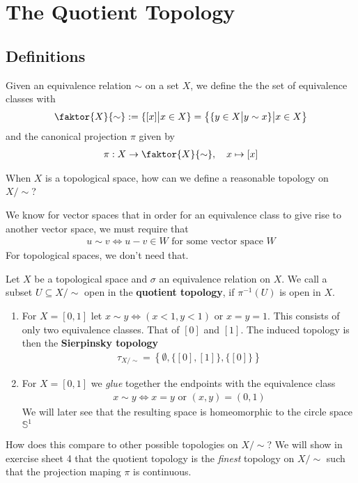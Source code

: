 \section{The Quotient Topology}
\subsection{Definitions}
Given an equivalence relation $\sim$ on a set $X$, we define the the set of equivalence classes with
\begin{align*}
  \faktor{X}{\sim} := \{[x] \big\vert x \in X\} = \left\{\{y \in X \big\vert y \sim x\}\big\vert x \in X\right\}
\end{align*}
and the canonical projection $\pi$ given by
\begin{align*}
  \pi: X \to \faktor{X}{\sim}, \quad x \mapsto [x]
\end{align*}

When $X$ is a topological space, how can we define a reasonable topology on $X/\sim$?

We know for vector spaces that in order for an equivalence class to give rise to another vector space, we must require that
\begin{align*}
  u \sim v \iff u - v \in W \text{ for some vector space } W
\end{align*}
For topological spaces, we don't need that.

\begin{dfn}[]
Let $X$ be a topological space and $\sigma$ an equivalence relation on $X$. 
We call a subset $U \subseteq X/\sim$ open in the \textbf{quotient topology}, if $\pi^{-1}(U)$ is open in $X$.
\end{dfn}


\begin{ex}[]
\begin{enumerate}
  \item For $X = [0,1]$ let $x \sim y \iff (x<1,y<1)$ or $x=y=1$.
      This consists of only two equivalence classes. 
      That of $[0]$ and $[1]$. The induced topology is then the \textbf{Sierpinsky topology}
      \begin{align*}
        \tau_{X/\sim} = \left\{
          \emptyset, \{[0],[1]\}, \{[0]\}
      \right\}
      \end{align*}
    \item For $X = [0,1]$ we \emph{glue} together the endpoints with the equivalence class
      \begin{align*}
        x \sim y \iff x = y \text{ or } (x,y) = (0,1)
      \end{align*}
      We will later see that the resulting space is homeomorphic to the circle space $\mathbb{S}^{1}$
\end{enumerate}
\end{ex}
How does this compare to other possible topologies on $X/\sim$?
We will show in exercise sheet 4 that the quotient topology is the \emph{finest} topology on $X/\sim$ such that the projection maping $\pi$ is continuous.

